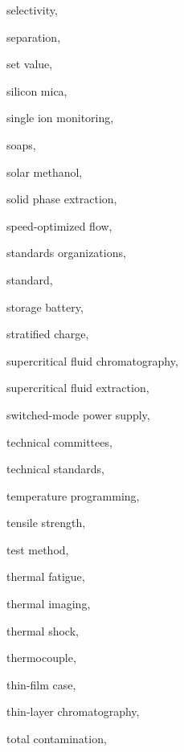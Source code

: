 \begin{theindex}
  \item \lowercase {selectivity}, 
  \item \lowercase {separation}, 
  \item \lowercase {set value}, 
  \item \lowercase {silicon mica}, 
  \item \lowercase {single ion monitoring}, 
  \item \lowercase {soaps}, 
  \item \lowercase {solar methanol}, 
  \item \lowercase {solid phase extraction}, 
  \item \lowercase {speed-optimized flow}, 
  \item \lowercase {standards organizations}, 
  \item \lowercase {standard}, 
  \item \lowercase {storage battery}, 
  \item \lowercase {stratified charge}, 
  \item \lowercase {supercritical fluid chromatography}, 
  \item \lowercase {supercritical fluid extraction}, 
  \item \lowercase {switched-mode power supply}, 
  \item \lowercase {technical committees}, 
  \item \lowercase {technical standards}, 
  \item \lowercase {temperature programming}, 
  \item \lowercase {tensile strength}, 
  \item \lowercase {test method}, 
  \item \lowercase {thermal fatigue}, 
  \item \lowercase {thermal imaging}, 
  \item \lowercase {thermal shock}, 
  \item \lowercase {thermocouple}, 
  \item \lowercase {thin-film case}, 
  \item \lowercase {thin-layer chromatography}, 
  \item \lowercase {total contamination}, 

\end{theindex}
